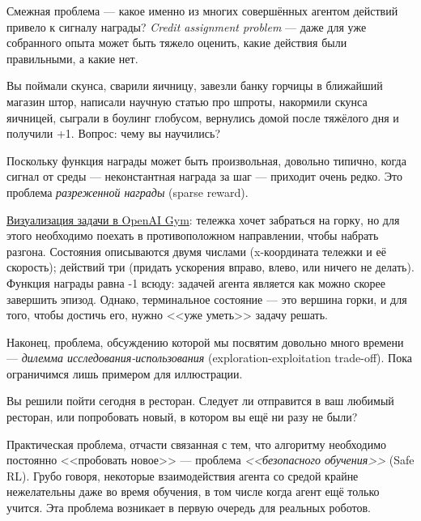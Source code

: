 Смежная проблема --- какое именно из многих совершённых агентом действий привело к сигналу награды? \emph{Credit assignment problem} --- даже для уже собранного опыта может быть тяжело оценить, какие действия были правильными, а какие нет. 

\begin{example}
Вы поймали скунса, сварили яичницу, завезли банку горчицы в ближайший магазин штор, написали научную статью про шпроты, накормили скунса яичницей, сыграли в боулинг глобусом, вернулись домой после тяжёлого дня и получили +1. Вопрос: чему вы научились? 
\end{example}

Поскольку функция награды может быть произвольная, довольно типично, когда сигнал от среды --- неконстантная награда за шаг --- приходит очень редко. Это проблема \emph{разреженной награды} (sparse reward).

\begin{example}
\href{https://gym.openai.com/envs/MountainCar-v0/}{Визуализация задачи в OpenAI Gym}: тележка хочет забраться на горку, но для этого необходимо поехать в противоположном направлении, чтобы набрать разгона. Состояния описываются двумя числами (x-координата тележки и её скорость); действий три (придать ускорения вправо, влево, или ничего не делать). Функция награды равна -1 всюду: задачей агента является как можно скорее завершить эпизод. Однако, терминальное состояние --- это вершина горки, и для того, чтобы достичь его, нужно <<уже уметь>> задачу решать.  
\end{example}

Наконец, проблема, обсуждению которой мы посвятим довольно много времени --- \emph{дилемма исследования-использования} (exploration-exploitation trade-off). Пока ограничимся лишь примером для иллюстрации.

\begin{example}
Вы решили пойти сегодня в ресторан. Следует ли отправится в ваш любимый ресторан, или попробовать новый, в котором вы ещё ни разу не были?
\end{example}

Практическая проблема, отчасти связанная с тем, что алгоритму необходимо постоянно <<пробовать новое>> --- проблема \emph{<<безопасного обучения>>} (Safe RL). Грубо говоря, некоторые взаимодействия агента со средой крайне нежелательны даже во время обучения, в том числе когда агент ещё только учится. Эта проблема возникает в первую очередь для реальных роботов.

